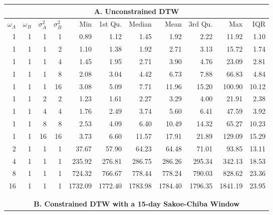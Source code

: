 \documentclass[12pt]{report}
\begin{document}
\begin{table}[!ht]
    \fontsize{10pt}{10pt}\selectfont
    \begin{center}
      \begin{tabular}{r r r r | r r r r r r r}
        \multicolumn{11}{c}{\textbf{A. Unconstrained DTW}} \\
        \midrule
        $\omega_{A}$ & $\omega_{B}$ & $\sigma^{2}_{A}$ & $\sigma^{2}_{B}$ & Min & 1st Qu. & Median & Mean & 3rd Qu. & Max & IQR \\
        \midrule
        1  & 1 & 1  & 1  &    0.89 &    1.12 &    1.45 &    1.92 &    2.22 &   11.92 &  1.10 \\
        \midrule
        1  & 1 & 1  & 2  &    1.10 &    1.38 &    1.92 &    2.71 &    3.13 &   15.72 &  1.74 \\
        1  & 1 & 1  & 4  &    1.45 &    1.95 &    2.71 &    3.90 &    4.76 &   23.09 &  2.81 \\
        1  & 1 & 1  & 8  &    2.08 &    3.04 &    4.42 &    6.73 &    7.88 &   66.83 &  4.84 \\
        1  & 1 & 1  & 16 &    3.08 &    5.09 &    7.71 &   11.96 &   15.20 &  100.90 & 10.12 \\
        \midrule
        1  & 1 & 2  & 2  &    1.23 &    1.61 &    2.27 &    3.29 &    4.00 &   21.91 &  2.38 \\
        1  & 1 & 4  & 4  &    1.76 &    2.49 &    3.74 &    5.60 &    6.41 &   47.59 &  3.92 \\
        1  & 1 & 8  & 8  &    2.53 &    4.09 &    6.40 &   10.49 &   14.32 &   65.27 & 10.23 \\
        1  & 1 & 16 & 16 &    3.73 &    6.60 &   11.57 &   17.91 &   21.89 &  129.09 & 15.29 \\
        \midrule
        2  & 1 & 1  & 1  &   37.67 &   57.90 &   64.23 &   64.48 &   71.01 &   93.85 & 13.11 \\
        4  & 1 & 1  & 1  &  235.92 &  276.81 &  286.75 &  286.26 &  295.34 &  342.13 & 18.53 \\
        8  & 1 & 1  & 1  &  724.32 &  766.67 &  778.44 &  778.24 &  790.03 &  828.62 & 23.36 \\
        16 & 1 & 1  & 1  & 1732.09 & 1772.40 & 1783.98 & 1784.40 & 1796.35 & 1841.19 & 23.95 \\
        \hline
        \\
        \\
        \multicolumn{11}{c}{\textbf{B. Constrained DTW with a 15-day Sakoe-Chiba Window}} \\

\end{tabular}
\end{center}
\end{table}
\end{document}
